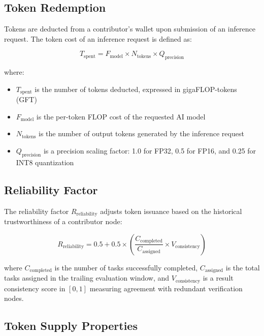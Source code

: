 \documentclass[12pt]{article}
\begin{document}
\subsection{Token Redemption}

Tokens are deducted from a contributor's wallet upon submission of an inference request. The token cost of an inference request is defined as:

\begin{equation}
T_{\text{spent}} = F_{\text{model}} \times N_{\text{tokens}} \times Q_{\text{precision}}
\label{eq:redemption}
\end{equation}

where:
\begin{itemize}
    \item $T_{\text{spent}}$ is the number of tokens deducted, expressed in gigaFLOP-tokens (GFT)
    \item $F_{\text{model}}$ is the per-token FLOP cost of the requested AI model
    \item $N_{\text{tokens}}$ is the number of output tokens generated by the inference request
    \item $Q_{\text{precision}}$ is a precision scaling factor: 1.0 for FP32, 0.5 for FP16, and 0.25 for INT8 quantization
\end{itemize}

\subsection{Reliability Factor}

The reliability factor $R_{\text{reliability}}$ adjusts token issuance based on the historical trustworthiness of a contributor node:

\begin{equation}
R_{\text{reliability}} = 0.5 + 0.5 \times \left(\frac{C_{\text{completed}}}{C_{\text{assigned}}} \times V_{\text{consistency}}\right)
\label{eq:reliability}
\end{equation}

where $C_{\text{completed}}$ is the number of tasks successfully completed, $C_{\text{assigned}}$ is the total tasks assigned in the trailing evaluation window, and $V_{\text{consistency}}$ is a result consistency score in $[0, 1]$ measuring agreement with redundant verification nodes.

\subsection{Token Supply Properties}
\end{document}
